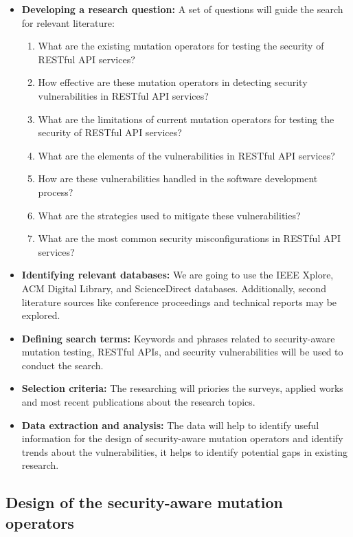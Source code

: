 \begin{itemize}
  \item \textbf{Developing a research question:} A set of questions will guide the search for relevant literature:
    \begin{enumerate}
      \item What are the existing mutation operators for testing the security of RESTful API services?
      \item How effective are these mutation operators in detecting security vulnerabilities in RESTful API services?
      \item What are the limitations of current mutation operators for testing the security of RESTful API services?
      \item What are the elements of the vulnerabilities in RESTful API services?
      \item How are these vulnerabilities handled in the software development process?
      \item What are the strategies used to mitigate these vulnerabilities?
      \item What are the most common security misconfigurations in RESTful API services?
    \end{enumerate}
  \item \textbf{Identifying relevant databases:} We are going to use the IEEE Xplore, ACM Digital Library, and ScienceDirect databases. Additionally, second literature sources like conference proceedings and technical reports may be explored.
  \item \textbf{Defining search terms:} Keywords and phrases related to security-aware mutation testing, RESTful APIs, and security vulnerabilities will be used to conduct the search.
  \item \textbf{Selection criteria:} The researching will priories the surveys, applied works and most recent publications about the research topics.
  \item \textbf{Data extraction and analysis:} The data will help to identify useful information for the design of security-aware mutation operators and identify trends about the vulnerabilities, it helps to identify potential gaps in existing research.
\end{itemize}

\subsection{Design of the security-aware mutation operators}

